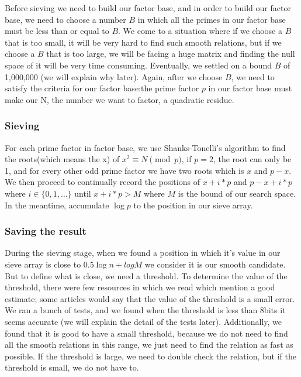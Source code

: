 \documentclass[12pt]{article} %
\begin{document}
	Before sieving we need to build our factor base, and in order to build our factor base, we need to choose a number $B$ in which all the primes in our factor base must be less than or equal to $B$. We come to a situation where if we choose a $B$ that is too small, it will be very hard to find such smooth relations, but if we choose a $B$ that is too large, we will be facing a huge matrix and finding the null space of it will be very time consuming. Eventually, we settled on a bound $B$ of 1,000,000 (we will explain why later). Again, after we choose $B$, we need to satisfy the criteria for our factor base:the prime factor $p$ in our factor base must make our N, the number we want to factor, a quadratic residue.
	
	\subsubsection {Sieving}
	
	For each prime factor in factor base, we use Shanks-Tonelli's algorithm to find the roots(which means the x) of $x^2 \equiv N \pmod{p}$, if $p = 2$, the root can only be 1, and for every other odd prime factor we have two roots which is $x$ and $p-x$. We then proceed to continually record the positions of $x+i*p$ and $p-x+i*p$ where $i \in \{0, 1, \dots \}$ until $x+i*p>M$ where $M$ is the bound of our search space. In the meantime, accumulate $\log{p}$ to the position in our sieve array.
	
	\subsubsection {Saving the result}
	
	During the sieving stage, when we found a position in which it's value in our sieve array is close to $0.5\log{n} + log{M}$ we consider it is our smooth candidate. But to define what is close, we need a threshold. To determine the value of the threshold, there were few resources in which we read which mention a good estimate; some articles would say that the value of the threshold is a small error. We ran a bunch of tests, and we found when the threshold is less than 8bits it seems accurate (we will explain the detail of the tests later). Additionally, we found that it is good to have a small threshold, because we do not need to find all the smooth relations in this range, we just need to find the relation as fast as possible. If the threshold is large, we need to double check the relation, but if the threshold is small, we do not have to.
	
\end{document}
